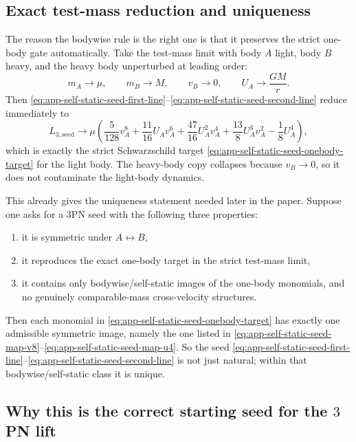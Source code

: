 \documentclass[11pt]{article}
\begin{document}
\subsection{Exact test-mass reduction and uniqueness}
\label{app:self-static-seed-testmass}

The reason the bodywise rule is the right one is that it preserves the strict
one-body gate automatically.  Take the test-mass limit with body $A$ light,
body $B$ heavy, and the heavy body unperturbed at leading order:
\begin{equation}
m_A\to \mu,
\qquad
m_B\to M,
\qquad
v_B\to 0,
\qquad
U_A\to \frac{GM}{r}.
\label{eq:app-self-static-seed-testmass-limit}
\end{equation}
Then \eqref{eq:app-self-static-seed-first-line}--\eqref{eq:app-self-static-seed-second-line}
reduce immediately to
\begin{equation}
L_{3,\mathrm{seed}}
\longrightarrow
\mu\left(
\frac5{128}v_A^8
+\frac{11}{16}U_Av_A^6
+\frac{47}{16}U_A^2v_A^4
+\frac{13}{8}U_A^3v_A^2
-\frac18U_A^4
\right),
\label{eq:app-self-static-seed-testmass-reduction}
\end{equation}
which is exactly the strict Schwarzschild target
\eqref{eq:app-self-static-seed-onebody-target} for the light body.
The heavy-body copy collapses because $v_B\to0$, so it does not contaminate the
light-body dynamics.

This already gives the uniqueness statement needed later in the paper.  Suppose
one asks for a $3$PN seed with the following three properties:
\begin{enumerate}
    \item it is symmetric under $A\leftrightarrow B$,
    \item it reproduces the exact one-body target in the strict test-mass limit,
    \item it contains only bodywise/self-static images of the one-body monomials,
          and no genuinely comparable-mass cross-velocity structures.
\end{enumerate}
Then each monomial in
\eqref{eq:app-self-static-seed-onebody-target} has exactly one admissible
symmetric image, namely the one listed in
\eqref{eq:app-self-static-seed-map-v8}--\eqref{eq:app-self-static-seed-map-u4}.
So the seed
\eqref{eq:app-self-static-seed-first-line}--\eqref{eq:app-self-static-seed-second-line}
is not just natural; within that bodywise/self-static class it is unique.

\subsection{Why this is the correct starting seed for the \texorpdfstring{$3$}{3}PN lift}
\label{app:self-static-seed-properties}
\end{document}
